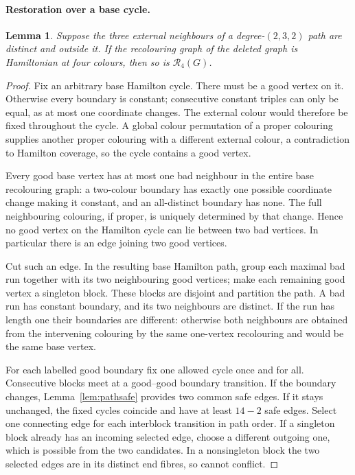 \documentclass[11pt]{article}
\newtheorem{lemma}[theorem]{Lemma}
\theoremstyle{remark}
\newcommand{\R}{\mathcal R}
\numberwithin{equation}{section}
\numberwithin{table}{section}
\begin{document}
\paragraph{Restoration over a base cycle.}
\begin{lemma}\label{lem:path232}
Suppose the three external neighbours of a degree-$(2,3,2)$ path are
distinct and outside it. If the recolouring graph of the deleted
graph is Hamiltonian at four colours, then so is $\R_4(G)$.
\end{lemma}
\begin{proof}
Fix an arbitrary base Hamilton cycle. There must be a good vertex
on it. Otherwise every boundary is constant; consecutive constant
triples can only be equal, as at most one coordinate changes. The
external colour would therefore be fixed throughout the cycle. A
global colour permutation of a proper colouring supplies another
proper colouring with a different external colour, a contradiction
to Hamilton coverage, so the cycle contains a good vertex.

Every good base vertex has at most one bad neighbour in the entire
base recolouring graph: a two-colour boundary has exactly one
possible coordinate change making it constant, and an all-distinct
boundary has none. The full neighbouring colouring, if proper, is
uniquely determined by that change. Hence no good vertex on the
Hamilton cycle can lie between two bad vertices. In particular there
is an edge joining two good vertices.

Cut such an edge. In the resulting base Hamilton path, group each
maximal bad run together with its two neighbouring good vertices;
make each remaining good vertex a singleton block. These blocks are
disjoint and partition the path. A bad run has constant boundary,
and its two neighbours are distinct. If the run has length one their
boundaries are different: otherwise both neighbours are obtained from
the intervening colouring by the same one-vertex recolouring and
would be the same base vertex.

For each labelled good boundary fix one allowed cycle once and for
all. Consecutive blocks meet at a good--good boundary transition.
If the boundary changes, Lemma~\ref{lem:pathsafe} provides two common
safe edges. If it stays unchanged, the fixed cycles coincide and
have at least $14-2$ safe edges. Select one connecting edge for each
interblock transition in path order. If a singleton block already has
an incoming selected edge, choose a different outgoing one, which is
possible from the two candidates. In a nonsingleton block the two
selected edges are in its distinct end fibres, so cannot conflict.


\end{proof}
\end{document}
